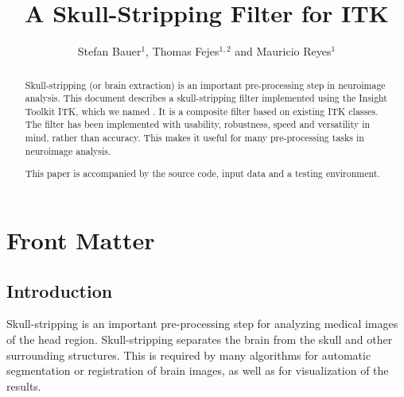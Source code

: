 \documentclass{InsightArticle}
\title{A Skull-Stripping Filter for ITK}
\author{Stefan Bauer$^{1}$, Thomas Fejes$^{1,2}$ and Mauricio Reyes$^{1}$}
\newcommand{\IJhandlerIDnumber}{3353}
\begin{document}
%
% 
\IJhandlefooter{\IJhandlerIDnumber}


\ifpdf
\else
\fi


\maketitle


\ifhtml
\chapter*{Front Matter\label{front}}
\fi


\begin{abstract}
\noindent

Skull-stripping (or brain extraction) is an important pre-processing step in neuroimage analysis.
This document describes a skull-stripping filter implemented using the Insight Toolkit
ITK, which we named  . It is a composite filter based on existing ITK classes. The filter has been implemented with usability, robustness, speed and versatility in mind, rather than accuracy. This makes it useful for many pre-processing tasks in neuroimage analysis.

This paper is accompanied by the source code, input data and a testing environment.
\end{abstract}

\IJhandlenote{\IJhandlerIDnumber}

\tableofcontents


\section{Introduction}

Skull-stripping is an important pre-processing step for analyzing medical images of the head region. Skull-stripping separates the brain from the skull and other surrounding structures. This is required by many algorithms for automatic segmentation or registration of brain images, as well as for visualization of the results.
\end{document}
